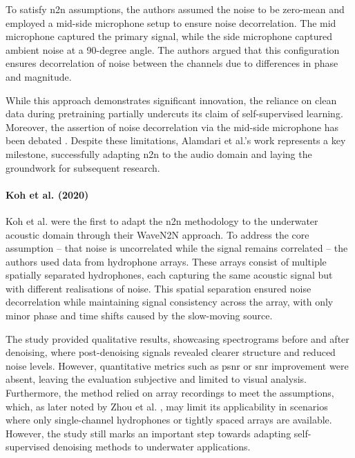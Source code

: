 To satisfy \acrshort{n2n} assumptions, the authors assumed the noise to be zero-mean and employed a mid-side microphone setup to ensure noise decorrelation. The mid microphone captured the primary signal, while the side microphone captured ambient noise at a 90-degree angle. The authors argued that this configuration ensures decorrelation of noise between the channels due to differences in phase and magnitude.

While this approach demonstrates significant innovation, the reliance on clean data during pretraining partially undercuts its claim of self-supervised learning. Moreover, the assertion of noise decorrelation via the mid-side microphone has been debated \cite{koh_underwater_2020}. Despite these limitations, Alamdari et al.'s work represents a key milestone, successfully adapting \acrshort{n2n} to the audio domain and laying the groundwork for subsequent research.

\paragraph{Koh et al. (2020)}

Koh et al. \cite{koh_underwater_2020} were the first to adapt the \acrshort{n2n} methodology to the underwater acoustic domain through their WaveN2N approach.  To address the core  assumption -- that noise is uncorrelated while the signal remains correlated -- the authors used data from hydrophone arrays. These arrays consist of multiple spatially separated hydrophones, each capturing the same acoustic signal but with different realisations of noise. This spatial separation ensured noise decorrelation while maintaining signal consistency across the array, with only minor phase and time shifts caused by the slow-moving source.

The study provided qualitative results, showcasing spectrograms before and after denoising, where post-denoising signals revealed clearer structure and reduced noise levels. However, quantitative metrics such as \acrshort{psnr} or \acrshort{snr} improvement were absent, leaving the evaluation subjective and limited to visual analysis. Furthermore, the method relied on array recordings to meet the  assumptions, which, as later noted by Zhou et al. \cite{zhou_self-noise_2023}, may limit its applicability in scenarios where only single-channel hydrophones or tightly spaced arrays are available. However, the study still marks an important step towards adapting self-supervised denoising methods to underwater applications.


